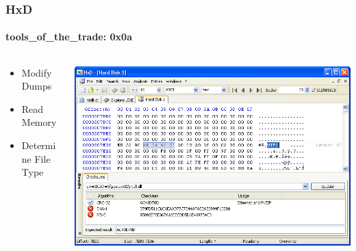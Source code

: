 \documentclass[aspectratio=169]{beamer}
\begin{document}
\begin{frame}
  \frametitle{HxD}
  \framesubtitle{tools\_of\_the\_trade: 0x0a}
  \begin{columns}
    \begin{column}{.3\textwidth}
      \begin{itemize}
      \item{Modify Dumps}
      \item{Read Memory}
      \item{Determine File Type}
      \end{itemize}
    \end{column}
    \hfill
    \begin{column}{.7\textwidth}
      \begin{center}
        \includegraphics[scale=0.35]{hxd}
      \end{center}
    \end{column}
  \end{columns}
\end{frame}
\end{document}
